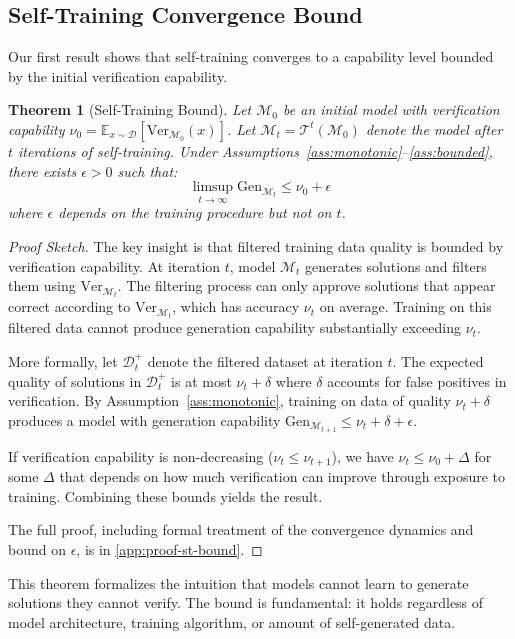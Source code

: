 \documentclass{article}
\newtheorem{theorem}{Theorem}
\theoremstyle{definition}
\theoremstyle{remark}
\newcommand{\M}{\mathcal{M}}  %
\newcommand{\D}{\mathcal{D}}  %
\newcommand{\T}{\mathcal{T}}  %
\newcommand{\Gen}{\text{Gen}}  %
\newcommand{\Ver}{\text{Ver}}  %
\newcommand{\E}{\mathbb{E}}    %
\begin{document}
\subsection{Self-Training Convergence Bound}

Our first result shows that self-training converges to a capability level bounded by the initial verification capability.

\begin{theorem}[Self-Training Bound]
\label{thm:self-training-bound}
Let \(\M_0\) be an initial model with verification capability \(\nu_0 = \E_{x \sim \D}[\Ver_{\M_0}(x)]\). Let \(\M_t = \T^t(\M_0)\) denote the model after \(t\) iterations of self-training. Under Assumptions~\ref{ass:monotonic}--\ref{ass:bounded}, there exists \(\epsilon > 0\) such that:
\[
\limsup_{t \to \infty} \Gen_{\M_t} \leq \nu_0 + \epsilon
\]
where \(\epsilon\) depends on the training procedure but not on \(t\).
\end{theorem}

\begin{proof}[Proof Sketch]
The key insight is that filtered training data quality is bounded by verification capability. At iteration \(t\), model \(\M_t\) generates solutions and filters them using \(\Ver_{\M_t}\). The filtering process can only approve solutions that appear correct according to \(\Ver_{\M_t}\), which has accuracy \(\nu_t\) on average. Training on this filtered data cannot produce generation capability substantially exceeding \(\nu_t\).

More formally, let \(\D_t^+\) denote the filtered dataset at iteration \(t\). The expected quality of solutions in \(\D_t^+\) is at most \(\nu_t + \delta\) where \(\delta\) accounts for false positives in verification. By Assumption~\ref{ass:monotonic}, training on data of quality \(\nu_t + \delta\) produces a model with generation capability \(\Gen_{\M_{t+1}} \leq \nu_t + \delta + \epsilon\).

If verification capability is non-decreasing (\(\nu_t \leq \nu_{t+1}\)), we have \(\nu_t \leq \nu_0 + \Delta\) for some \(\Delta\) that depends on how much verification can improve through exposure to training. Combining these bounds yields the result.

The full proof, including formal treatment of the convergence dynamics and bound on \(\epsilon\), is in \cref{app:proof-st-bound}.
\end{proof}

This theorem formalizes the intuition that models cannot learn to generate solutions they cannot verify. The bound is fundamental: it holds regardless of model architecture, training algorithm, or amount of self-generated data.
\end{document}
